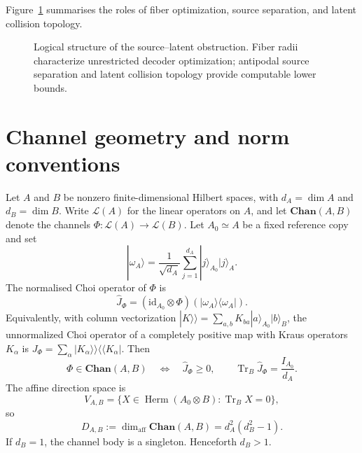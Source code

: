 \documentclass[11pt,a4paper]{article}
\theoremstyle{definition}
\theoremstyle{plain}
\theoremstyle{remark}
\DeclareMathOperator{\Tr}{Tr}
\DeclareMathOperator{\Herm}{Herm}
\newcommand{\Lin}{\mathcal L}
\newcommand{\Chan}{\mathbf{Chan}}
\newcommand{\id}{\mathrm{id}}
\newcommand{\affdim}{\dim_{\mathrm{aff}}}
\begin{document}
Figure~\ref{fig:dependency} summarises the roles of fiber optimization,
source separation, and latent collision topology.

\begin{figure}[t]
\centering
{}
\caption{Logical structure of the source--latent obstruction. Fiber radii
characterize unrestricted decoder optimization; antipodal source separation
and latent collision topology provide computable lower bounds.}
\label{fig:dependency}
\end{figure}


\section{Channel geometry and norm conventions}
\label{sec:geometry}

Let $A$ and $B$ be nonzero finite-dimensional Hilbert spaces, with
$d_A=\dim A$ and $d_B=\dim B$. Write $\Lin(A)$ for the linear operators on
$A$, and let $\Chan(A,B)$ denote the channels
$\Phi:\Lin(A)\to\Lin(B)$. Let $A_0\simeq A$ be a fixed reference copy and
set
\[
|\omega_A\rangle
=\frac1{\sqrt{d_A}}\sum_{j=1}^{d_A}|j\rangle_{A_0}|j\rangle_A.
\]
The normalised Choi operator of $\Phi$ is
\cite{Choi1975,Jamiolkowski1972}
\[
\widehat J_\Phi
=(\id_{A_0}\otimes\Phi)(|\omega_A\rangle\langle\omega_A|).
\]
Equivalently, with column vectorization
$|K\rangle\rangle=\sum_{a,b}K_{ba}|a\rangle_{A_0}|b\rangle_B$,
the unnormalized Choi operator of a completely positive map with Kraus
operators $K_\alpha$ is
$J_\Phi=\sum_\alpha|K_\alpha\rangle\rangle
\langle\langle K_\alpha|$.
Then
\[
\Phi\in\Chan(A,B)
\quad\Longleftrightarrow\quad
\widehat J_\Phi\geq0,
\qquad
\Tr_B\widehat J_\Phi=\frac{I_{A_0}}{d_A}.
\]
The affine direction space is
\[
V_{A,B}=\{X\in\Herm(A_0\otimes B):\Tr_BX=0\},
\]
so
\begin{equation}
\label{eq:channel-dimension}
D_{A,B}:=\affdim\Chan(A,B)=d_A^2(d_B^2-1).
\end{equation}
If $d_B=1$, the channel body is a singleton. Henceforth $d_B>1$.
\end{document}

